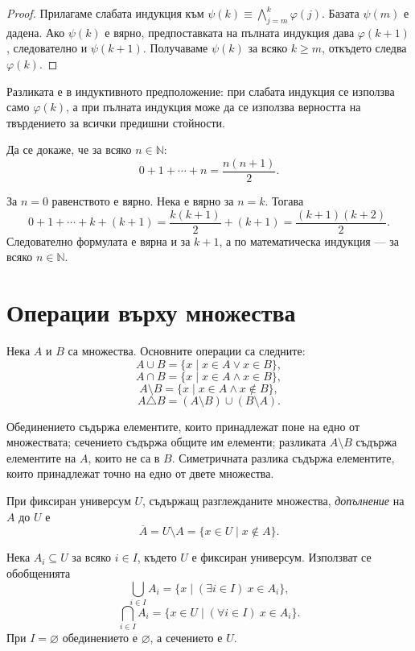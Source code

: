 \begin{proof}
Прилагаме слабата индукция към $\psi(k)\equiv\bigwedge_{j=m}^{k}\varphi(j)$. Базата $\psi(m)$ е дадена. Ако $\psi(k)$ е вярно, предпоставката на пълната индукция дава $\varphi(k+1)$, следователно и $\psi(k+1)$. Получаваме $\psi(k)$ за всяко $k\ge m$, откъдето следва $\varphi(k)$.
\end{proof}

Разликата е в индуктивното предположение: при слабата индукция се използва само $\varphi(k)$, а при пълната индукция може да се използва верността на твърдението за всички предишни стойности.

\begin{example}
Да се докаже, че за всяко $n\in\mathbb N$:
\[
0+1+\cdots+n=\frac{n(n+1)}{2}.
\]

За $n=0$ равенството е вярно. Нека е вярно за $n=k$. Тогава
\[
0+1+\cdots+k+(k+1)
=
\frac{k(k+1)}{2}+(k+1)
=
\frac{(k+1)(k+2)}{2}.
\]
Следователно формулата е вярна и за $k+1$, а по математическа индукция --- за всяко $n\in\mathbb N$.
\end{example}

\section{Операции върху множества}\label{s:1.3}

\begin{defn}
Нека $A$ и $B$ са множества. Основните операции са следните:
\[
A\cup B=\{x\mid x\in A\lor x\in B\},
\]
\[
A\cap B=\{x\mid x\in A\land x\in B\},
\]
\[
A\setminus B=\{x\mid x\in A\land x\notin B\},
\]
\[
A\triangle B=(A\setminus B)\cup(B\setminus A).
\]
\end{defn}

Обединението съдържа елементите, които принадлежат поне на едно от множествата; сечението съдържа общите им елементи; разликата $A\setminus B$ съдържа елементите на $A$, които не са в $B$. Симетричната разлика съдържа елементите, които принадлежат точно на едно от двете множества.

\begin{defn}[Допълнение]
При фиксиран универсум $U$, съдържащ разглежданите множества, \emph{допълнение} на $A$ до $U$ е
\[
\overline A=U\setminus A=\{x\in U\mid x\notin A\}.
\]
\end{defn}

\begin{defn}
Нека $A_i\subseteq U$ за всяко $i\in I$, където $U$ е фиксиран универсум. Използват се обобщенията
\[
\bigcup_{i\in I}A_i
=
\{x\mid (\exists i\in I)\ x\in A_i\},
\]
\[
\bigcap_{i\in I}A_i
=
\{x\in U\mid (\forall i\in I)\ x\in A_i\}.
\]
При $I=\varnothing$ обединението е $\varnothing$, а сечението е $U$.
\end{defn}

